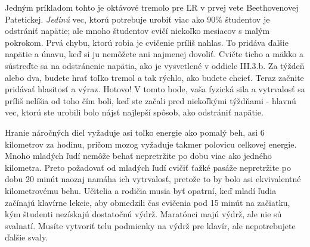 Jedným príkladom tohto je oktávové tremolo pre ĽR v prvej vete Beethovenovej Patetickej. \textit{Jedinú} vec, ktorú potrebuje urobiť viac ako 90\% študentov je odstrániť napätie; ale mnoho študentov cvičí niekoľko mesiacov s malým pokrokom. Prvá chybu, ktorú robia je cvičenie príliš nahlas. To pridáva ďalšie napätie a únavu, keď si ju nemôžete ani najmenej dovoliť. Cvičte ticho a mäkko a sústreďte sa na odstránenie napätia, ako je vysvetlené v oddiele III.3.b. Za týždeň alebo dva, budete hrať toľko tremol a tak rýchlo, ako budete chcieť. Teraz začnite pridávať hlasitosť a výraz. Hotovo! V tomto bode, vaša fyzická sila a vytrvalosť sa príliš nelíšia od toho čím boli, keď ste začali pred niekoľkými týždňami - hlavnú vec, ktorú ste urobili bolo nájsť najlepší spôsob, ako odstrániť napätie.

Hranie náročných diel vyžaduje asi toľko energie ako pomalý beh, asi 6 kilometrov za hodinu, pričom mozog vyžaduje takmer polovicu celkovej energie. Mnoho mladých ľudí nemôže behať nepretržite po dobu viac ako jedného kilometra. Preto požadovať od mladých ľudí cvičiť ťažké pasáže nepretržite po dobu 20 minút naozaj namáha ich vytrvalosť, pretože to by bolo asi ekvivalentné kilometrovému behu. Učitelia a rodičia musia byť opatrní, keď mladí ľudia začínajú klavírne lekcie, aby obmedzili čas cvičenia pod 15 minút na začiatku, kým študenti nezískajú dostatočnú výdrž. Maratónci majú výdrž, ale nie sú svalnatí. Musíte vytvoriť telu podmienky na výdrž pre klavír, ale nepotrebujete ďalšie svaly.

